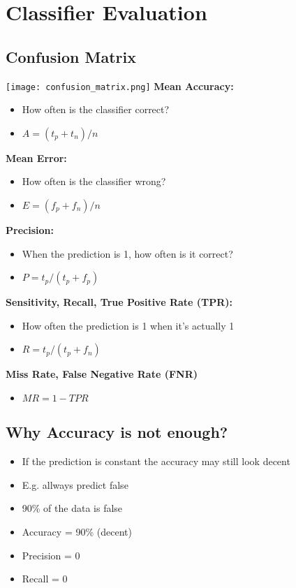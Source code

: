 \section{Classifier Evaluation}
\subsection{Confusion Matrix}
\texttt{[image: confusion\_matrix.png]}
\textbf{Mean Accuracy:}
\begin{itemize}
    \item How often is the classifier correct?
    \item $A = (t_p + t_n) / n$
\end{itemize}
\textbf{Mean Error:}
\begin{itemize}
    \item How often is the classifier wrong?
    \item $E = (f_p + f_n) / n$
\end{itemize}
\textbf{Precision:}
\begin{itemize}
    \item When the prediction is 1, how often is it correct?
    \item $P = t_p / (t_p + f_p)$
\end{itemize}
\textbf{Sensitivity, Recall, True Positive Rate (TPR):}
\begin{itemize}
    \item How often the prediction is 1 when it's actually 1
    \item $R = t_p / (t_p + f_n)$
\end{itemize}
\textbf{Miss Rate, False Negative Rate (FNR)}
\begin{itemize}
    \item $MR = 1 - TPR$
\end{itemize}

\subsection{Why Accuracy is not enough?}
\begin{itemize}
    \item If the prediction is constant the accuracy may still look decent
    \item E.g. allways predict false
    \item 90\% of the data is false
    \item Accuracy = 90\% (decent)
    \item Precision = 0
    \item Recall = 0
\end{itemize}

